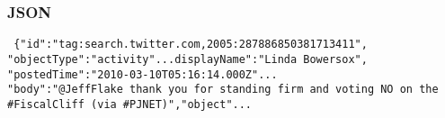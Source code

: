 \documentclass{beamer}
\numberwithin{equation}{section}
\begin{document}
\begin{frame}
\frametitle{JSON}

{\tt
\{"id":"tag:search.twitter.com,2005:287886850381713411",\\"objectType":"activity"...displayName":"Linda Bowersox",\\"postedTime":"2010-03-10T05:16:14.000Z"...\\"body":"@JeffFlake thank you for standing firm and voting NO on the \#FiscalCliff (via \#PJNET)","object"...
}



\end{frame}
























\end{document}
